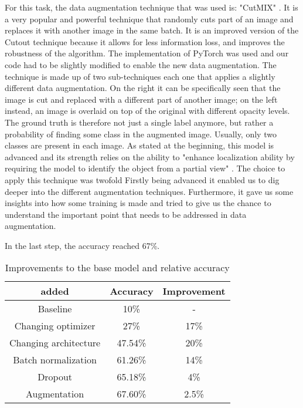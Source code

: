 \documentclass{article} %
\begin{document}
For this task, the data augmentation technique that was used is: "CutMIX" \cite{yun2019cutmix}. It is a very popular and powerful technique that randomly cuts part of an image and replaces it with another image in the same batch. It is an improved version of the Cutout technique because it allows for less information loss, and improves the robustness of the algorithm. The implementation of PyTorch was used \cite{cutmixpytorch} and our code had to be slightly modified to enable the new data augmentation. The technique is made up of two sub-techniques each one that applies a slightly different data augmentation. On the right it can be specifically seen that the image is cut and replaced with a different part of another image; on the left instead, an image is overlaid on top of the original with different opacity levels. The ground truth is therefore not just a single label anymore, but rather a probability of finding some class in the augmented image. Usually, only two classes are present in each image.
As stated at the beginning, this model is advanced and its strength relies on the ability to "enhance localization ability by requiring the model to identify the object from a partial view" \cite{yun2019cutmix}. The choice to apply this technique was twofold Firstly being advanced it enabled us to dig deeper into the different augmentation techniques. Furthermore, it gave us some insights into how some training is made and tried to give us the chance to understand the important point that needs to be addressed in data augmentation.

In the last step, the accuracy reached 67\%.

\begin{table}[h!]
\centering
\begin{tabular}{ | c | c | c | }
\hline
 added & Accuracy & Improvement \\ 
 \hline
 Baseline & 10\% & - \\   
 Changing optimizer & 27\% & 17\% \\ 
 Changing architecture & 47.54\% & 20\%\\
 Batch normalization &  61.26\% & 14\% \\
 Dropout & 65.18\% & 4\% \\
 Augmentation & 67.60\% & 2.5\%\\
\hline
\end{tabular}
\caption{Improvements to the base model and relative accuracy}
\vspace{-20pt}
\label{table:2}
\end{table}
\end{document}
